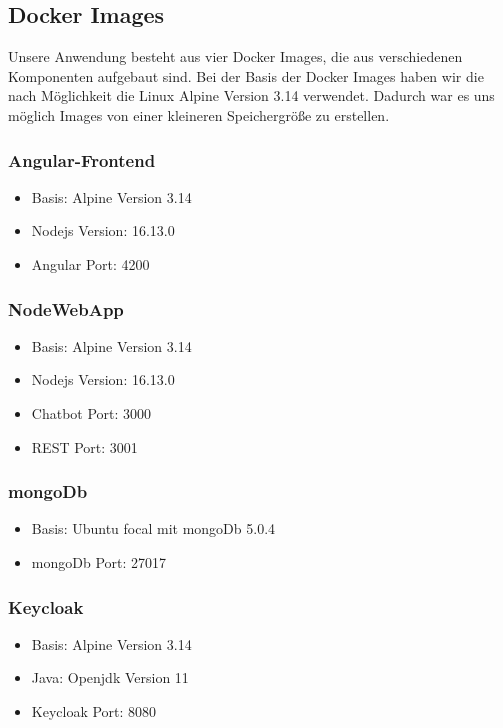 \subsection{Docker Images}
Unsere Anwendung besteht aus vier Docker Images,
die aus verschiedenen Komponenten aufgebaut sind.
Bei der Basis der Docker Images haben wir die nach Möglichkeit die Linux Alpine Version 3.14 verwendet.
Dadurch war es uns möglich Images von einer kleineren Speichergröße zu erstellen.

\subsubsection{Angular-Frontend}
\begin{itemize}
    \item Basis: Alpine Version 3.14
    \item Nodejs Version: 16.13.0
    \item Angular Port: 4200
\end{itemize}

\subsubsection{NodeWebApp}
\begin{itemize}
    \item Basis: Alpine Version 3.14
    \item Nodejs Version: 16.13.0
    \item Chatbot Port: 3000
    \item REST Port: 3001
\end{itemize}

\subsubsection{mongoDb}
\begin{itemize}
    \item Basis: Ubuntu focal mit mongoDb 5.0.4
    \item mongoDb Port: 27017
\end{itemize}

\subsubsection{Keycloak}
\begin{itemize}
    \item Basis: Alpine Version 3.14
    \item Java: Openjdk Version 11
    \item Keycloak Port: 8080
\end{itemize}



